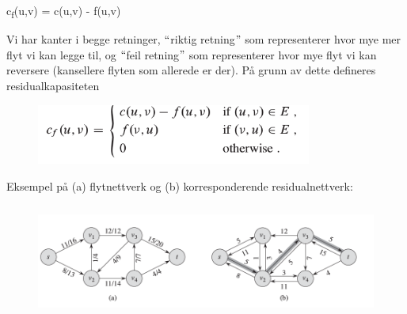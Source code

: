 \documentclass[12pt]{report}
\begin{document}
\begin{Center}
 c\textsubscript{f}(u,v) = c(u,v) - f(u,v) 
\end{Center}\par

Vi har kanter i begge retninger, $``$riktig retning$"$  som representerer hvor mye mer flyt vi kan legge til, og $``$feil retning$"$  som representerer hvor mye flyt vi kan reversere (kansellere flyten som allerede er der). På grunn av dette defineres residualkapasiteten \par




\begin{figure}[H]
	\begin{Center}
		\includegraphics[width=3.56in,height=0.78in]{./media/image142.png}
	\end{Center}
\end{figure}



\par

Eksempel på (a) flytnettverk og (b) korresponderende residualnettverk:\par




\begin{figure}[H]
	\begin{Center}
		\includegraphics[width=5.35in,height=1.47in]{./media/image143.png}
	\end{Center}
\end{figure}


\end{document}
